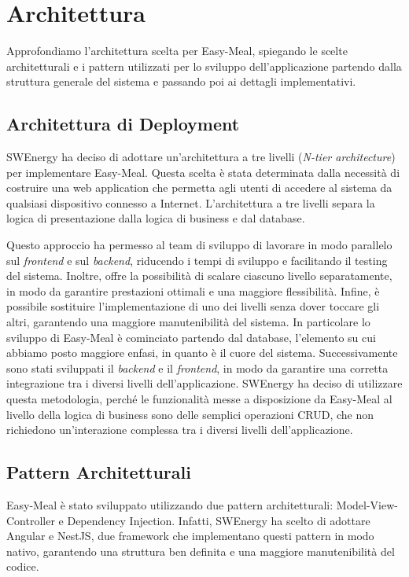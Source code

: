 \section{Architettura}

Approfondiamo l'architettura scelta per Easy-Meal, spiegando le scelte
architetturali e i pattern utilizzati per lo sviluppo dell'applicazione partendo
dalla struttura generale del sistema e passando poi ai dettagli implementativi.

\subsection{Architettura di Deployment}

SWEnergy ha deciso di adottare un'architettura a tre livelli (\textit{N-tier
architecture}) per implementare 
Easy-Meal. Questa scelta è stata determinata dalla necessità di costruire una 
web application che permetta agli utenti di accedere al sistema da qualsiasi 
dispositivo connesso a Internet. L'architettura a tre livelli
separa la logica di presentazione dalla logica di business e dal database.

Questo approccio ha permesso al team di sviluppo di lavorare in modo parallelo 
sul \textit{frontend} e sul \textit{backend}, riducendo i tempi di sviluppo e 
facilitando il 
testing del sistema. Inoltre, offre la possibilità di scalare ciascuno 
livello separatamente, in modo da garantire prestazioni ottimali e una 
maggiore flessibilità. Infine, è possibile sostituire l'implementazione di 
uno dei livelli senza dover toccare gli altri, garantendo una maggiore 
manutenibilità del sistema.
In particolare lo sviluppo di Easy-Meal è cominciato partendo dal database,
l'elemento su cui abbiamo posto maggiore enfasi, in quanto è il cuore del
sistema. Successivamente sono stati sviluppati il \textit{backend} e il
\textit{frontend}, in modo da garantire una corretta integrazione tra i
diversi livelli dell'applicazione. SWEnergy ha deciso di utilizzare questa
metodologia, perché le funzionalità messe a disposizione da Easy-Meal al livello
della logica di business sono delle semplici operazioni CRUD, che non richiedono
un'interazione complessa tra i diversi livelli dell'applicazione.

\subsection{Pattern Architetturali}

Easy-Meal è stato sviluppato utilizzando due pattern architetturali:
Model-View-Controller e Dependency Injection. Infatti, SWEnergy ha scelto di
adottare Angular e NestJS, due framework che implementano questi pattern in modo
nativo, garantendo una struttura ben definita e una maggiore manutenibilità del
codice.


